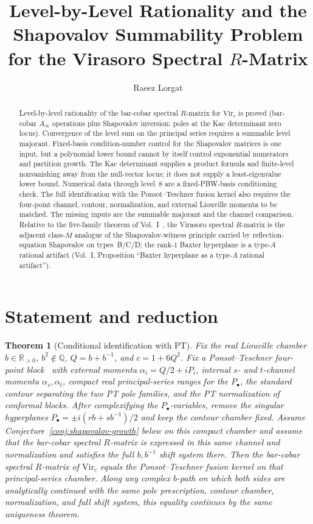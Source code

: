\documentclass[11pt]{amsart}
\title{Level-by-Level Rationality and the Shapovalov Summability Problem\\
for the Virasoro Spectral $R$-Matrix}
\author{Raeez Lorgat}
\newtheorem{theorem}{Theorem}[section]
\theoremstyle{definition}
\theoremstyle{remark}
\providecommand{\Ainf}{A_\infty}
\begin{document}
\maketitle

\begin{abstract}
Level-by-level rationality of the bar-cobar spectral $R$-matrix
for $\mathrm{Vir}_c$ is proved (bar-cobar $\Ainf$ operations plus
Shapovalov inversion: poles at the Kac determinant zero locus).
Convergence of the level sum on the principal series requires a
summable level majorant.  Fixed-basis condition-number control for the
Shapovalov matrices is one input, but a polynomial lower bound cannot
by itself control exponential numerators and partition growth.  The Kac
determinant supplies a
product formula and finite-level nonvanishing away from the null-vector
locus; it does not supply a least-eigenvalue lower bound.  Numerical
data through level~$8$ are a fixed-PBW-basis conditioning check.  The
full identification with the Ponsot--Teschner fusion kernel also
requires the four-point channel, contour, normalization, and external
Liouville momenta to be matched.  The missing inputs are the
summable majorant and the channel comparison.  Relative to the
five-family theorem of Vol.~I~\cite{VolI}, the Virasoro spectral
$R$-matrix is the adjacent class-$M$ analogue of the
Shapovalov-witness principle carried by reflection-equation Shapovalov
on types~B/C/D; the
rank-$1$ Baxter hyperplane is a type-$A$ rational artifact
(Vol.~I, Proposition ``Baxter hyperplane as a type-$A$ rational
artifact'').
\end{abstract}

\section{Statement and reduction}

\begin{theorem}[Conditional identification with PT]
\label{thm:rpt-conditional}
Fix the real Liouville chamber
$b \in \mathbb{R}_{>0}$, $b^2 \notin \mathbb{Q}$,
$Q=b+b^{-1}$, and $c=1+6Q^2$.  Fix a Ponsot--Teschner four-point
block~\cite{PT01,TeschnerLiouville} with external momenta
$\alpha_i=Q/2+iP_i$, internal $s$- and $t$-channel momenta
$\alpha_s,\alpha_t$, compact real principal-series ranges for the
$P_\bullet$, the standard contour separating the two PT pole families,
and the PT normalization of conformal blocks.  After complexifying the
$P_\bullet$-variables, remove the singular hyperplanes
$P_\bullet=\pm i(rb+s b^{-1})/2$ and keep the contour chamber fixed.
Assume Conjecture~\ref{conj:shapovalov-growth} below on this compact
chamber and assume that the bar-cobar spectral $R$-matrix is expressed
in this same channel and normalization and satisfies the full
$b,b^{-1}$ shift system there.  Then the bar-cobar spectral
$R$-matrix of $\mathrm{Vir}_c$ equals the Ponsot--Teschner fusion
kernel on that principal-series chamber.  Along any complex
$b$-path on which both sides are analytically continued with the same
pole prescription, contour chamber, normalization, and full shift
system, this equality continues by the same uniqueness theorem.
\end{theorem}
\end{document}
